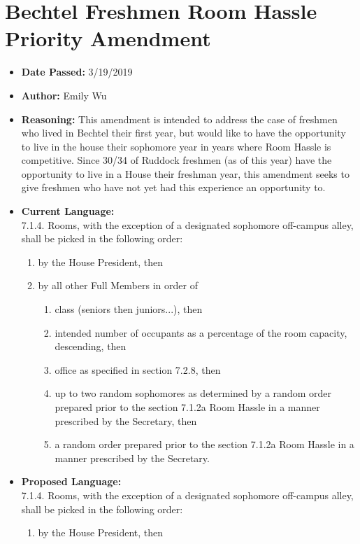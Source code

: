 \documentclass[10pt]{article} %
\begin{document}
\section{Bechtel Freshmen Room Hassle Priority Amendment}
\begin{itemize}
	\item \textbf{Date Passed:} 3/19/2019
	\item \textbf{Author:} Emily Wu
	\item \textbf{Reasoning:} This amendment is intended to address the case of freshmen who lived in Bechtel their first year, but would like to have the opportunity to live in the house their sophomore year in years where Room Hassle is competitive. Since 30/34 of Ruddock freshmen (as of this year) have the opportunity to live in a House their freshman year, this amendment seeks to give freshmen who have not yet had this experience an opportunity to. 
	\item \textbf{Current Language:} \\
	7.1.4. Rooms, with the exception of a designated sophomore off-campus alley, shall be picked in the following order: 
	\begin{enumerate}[label=(\alph*)]
		\item by the House President, then 
		\item by all other Full Members in order of 
		\begin{enumerate}[label=(\roman*)]
			\item class (seniors then juniors...), then 
			\item intended number of occupants as a percentage of the room capacity, descending, then 
			\item office as specified in section 7.2.8, then 
			\item up to two random sophomores as determined by a random order prepared prior to the section 7.1.2a Room Hassle in a manner prescribed by the Secretary, then 
			\item a random order prepared prior to the section 7.1.2a Room Hassle in a manner prescribed by the Secretary.
		\end{enumerate}
	\end{enumerate}
	\item \textbf{Proposed Language:} \\
	7.1.4. Rooms, with the exception of a designated sophomore off-campus alley, shall be picked in the following order: 
	\begin{enumerate}[label=(\alph*)]
		\item by the House President, then 

\end{enumerate}
\end{itemize}
\end{document}
